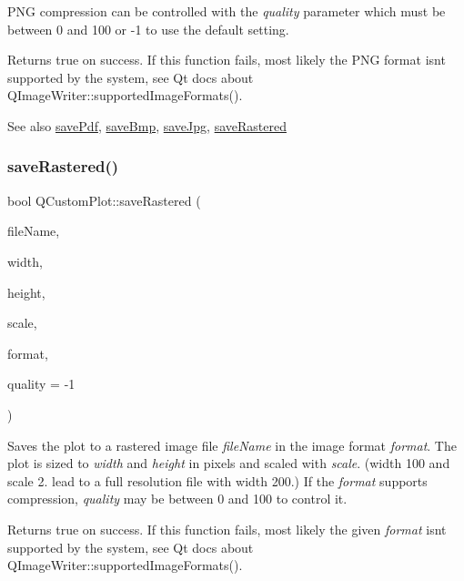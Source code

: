 P\+NG compression can be controlled with the {\itshape quality} parameter which must be between 0 and 100 or -\/1 to use the default setting.

Returns true on success. If this function fails, most likely the P\+NG format isn\textquotesingle{}t supported by the system, see Qt docs about Q\+Image\+Writer\+::supported\+Image\+Formats().

\begin{DoxySeeAlso}{See also}
\hyperlink{class_q_custom_plot_a632da44c6d94ea8b271eb483b08b5114}{save\+Pdf}, \hyperlink{class_q_custom_plot_a6629d9e8e6da4bf18055ee0257fdce9a}{save\+Bmp}, \hyperlink{class_q_custom_plot_a490c722092d1771e8ce4a7a73dfd84ab}{save\+Jpg}, \hyperlink{class_q_custom_plot_ab528b84cf92baabe29b1d0ef2f77c93e}{save\+Rastered} 
\end{DoxySeeAlso}
\hypertarget{class_q_custom_plot_ab528b84cf92baabe29b1d0ef2f77c93e}{}\label{class_q_custom_plot_ab528b84cf92baabe29b1d0ef2f77c93e} 
\subsubsection{\texorpdfstring{save\+Rastered()}{saveRastered()}}
{\footnotesize\ttfamily bool Q\+Custom\+Plot\+::save\+Rastered (\begin{DoxyParamCaption}\item[{const Q\+String \&}]{file\+Name,  }\item[{int}]{width,  }\item[{int}]{height,  }\item[{double}]{scale,  }\item[{const char $\ast$}]{format,  }\item[{int}]{quality = {\ttfamily -\/1} }\end{DoxyParamCaption})}

Saves the plot to a rastered image file {\itshape file\+Name} in the image format {\itshape format}. The plot is sized to {\itshape width} and {\itshape height} in pixels and scaled with {\itshape scale}. (width 100 and scale 2. lead to a full resolution file with width 200.) If the {\itshape format} supports compression, {\itshape quality} may be between 0 and 100 to control it.

Returns true on success. If this function fails, most likely the given {\itshape format} isn\textquotesingle{}t supported by the system, see Qt docs about Q\+Image\+Writer\+::supported\+Image\+Formats().

